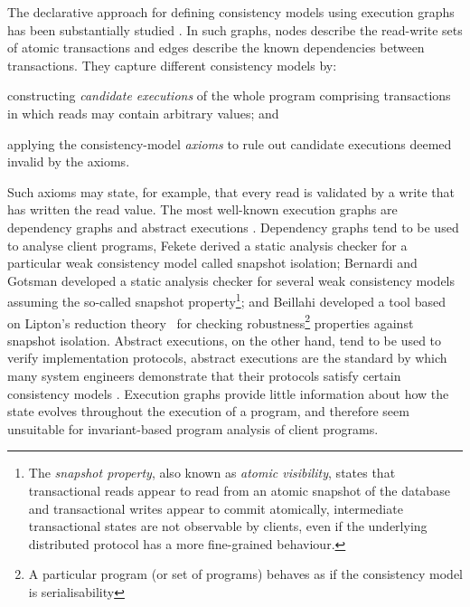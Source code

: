 The declarative approach for defining 
consistency models using execution graphs has been substantially
studied \cite{adya,ev_transactions,framework-concur,SIanalysis,laws}. 
In such graphs, nodes describe the read-write sets of  atomic transactions and edges describe the
known dependencies between transactions.
They capture different consistency models by:
\begin{enumerate*}
	\item constructing  \emph{candidate executions} of the whole program comprising
transactions in which reads may contain arbitrary values; and 
	\item applying the consistency-model \emph{axioms} to rule out candidate executions deemed invalid by the axioms. 
\end{enumerate*}
Such axioms may state, for example, that every read is
validated by a write that has written the read value. 
The most well-known execution graphs are dependency graphs \cite{adya} and abstract
executions \cite{ev_transactions,framework-concur}. 
Dependency graphs tend to be used to analyse  client programs, \eg 
Fekete \etal\citet{fekete-tods} derived 
a static analysis checker for a particular weak consistency model called
snapshot isolation;  Bernardi and Gotsman \citet{giovanni_concur16}
developed a static analysis checker for several weak consistency
models assuming the so-called snapshot property\footnote{The \emph{snapshot property}, 
also known as \emph{atomic visibility}, states that transactional reads appear to read from an atomic snapshot
of the database and transactional writes appear to commit atomically, \ie intermediate transactional states are not observable by clients, 
even if the underlying distributed protocol has a more fine-grained behaviour.}; and 
Beillahi \etal\citep{snapshot-isolation-robust-tool} developed a tool based on Lipton's reduction theory~\cite{Lipton-reduction}
for checking robustness\footnote{A particular program (or set of programs) behaves as if the consistency model is serialisability} properties against snapshot isolation.
Abstract executions, on the other hand, tend to be used to verify  implementation protocols, \eg
abstract executions are the  standard by which many system engineers
demonstrate that their protocols satisfy  certain
consistency models \cite{cops,NMSI,PSI}. 
Execution graphs provide little information about how the 
state evolves throughout the execution of a program, and 
therefore seem  unsuitable for invariant-based program analysis 
of client programs. 


